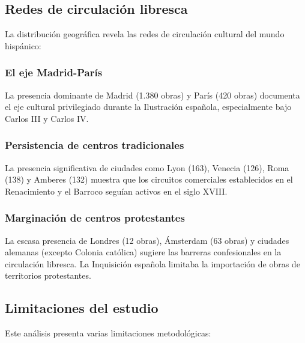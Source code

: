 \documentclass[12pt,a4paper]{article}
\begin{document}
\subsection{Redes de circulación libresca}

La distribución geográfica revela las redes de circulación cultural del mundo hispánico:

\subsubsection{El eje Madrid-París}

La presencia dominante de Madrid (1.380 obras) y París (420 obras) documenta el eje cultural privilegiado durante la Ilustración española, especialmente bajo Carlos III y Carlos IV.

\subsubsection{Persistencia de centros tradicionales}

La presencia significativa de ciudades como Lyon (163), Venecia (126), Roma (138) y Amberes (132) muestra que los circuitos comerciales establecidos en el Renacimiento y el Barroco seguían activos en el siglo XVIII.

\subsubsection{Marginación de centros protestantes}

La escasa presencia de Londres (12 obras), Ámsterdam (63 obras) y ciudades alemanas (excepto Colonia católica) sugiere las barreras confesionales en la circulación libresca. La Inquisición española limitaba la importación de obras de territorios protestantes.

\subsection{Limitaciones del estudio}

Este análisis presenta varias limitaciones metodológicas:
\end{document}
